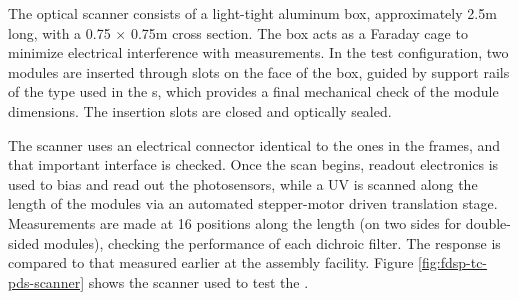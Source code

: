The optical scanner consists of a light-tight aluminum box, approximately \num{2.5}m long, with a \num{0.75} $\times$ \num{0.75}m cross section. The box acts as a Faraday cage to minimize electrical interference with measurements. In the  test configuration, two  modules are inserted through slots on the face of the box, guided by support rails of the type used in the s, which provides a final mechanical check of the  module dimensions.  The insertion slots are closed and optically sealed. 

The scanner  uses an electrical connector identical to the ones in the  frames, and that important interface is checked. Once the scan begins,   readout electronics is used to bias and read out the photosensors, while a UV  is scanned along the length of the modules via an automated stepper-motor driven translation stage.  Measurements are made at 16 positions along the length (on two sides for double-sided  modules), checking the performance of each  dichroic filter. The response is compared to that measured earlier at the assembly facility. Figure \ref{fig:fdsp-tc-pds-scanner} shows the scanner used to test the  .

